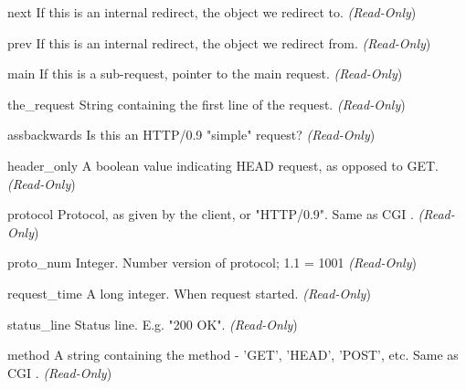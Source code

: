 \begin{memberdesc}[Request]{next}
If this is an internal redirect, the  object we redirect to. 
\emph{(Read-Only})
\end{memberdesc}

\begin{memberdesc}[Request]{prev}
If this is an internal redirect, the  object we redirect from.
\emph{(Read-Only})
\end{memberdesc}

\begin{memberdesc}[Request]{main}
If this is a sub-request, pointer to the main request. 
\emph{(Read-Only})
\end{memberdesc}

\begin{memberdesc}[Request]{the_request}
String containing the first line of the request.
\emph{(Read-Only})
\end{memberdesc}

\begin{memberdesc}[Request]{assbackwards}
Is this an HTTP/0.9 "simple" request? 
\emph{(Read-Only})
\end{memberdesc}

\begin{memberdesc}[Request]{header_only}
A boolean value indicating HEAD request, as opposed to GET. 
\emph{(Read-Only})
\end{memberdesc}

\begin{memberdesc}[Request]{protocol}
Protocol, as given by the client, or "HTTP/0.9". Same as CGI .
\emph{(Read-Only})
\end{memberdesc}

\begin{memberdesc}[Request]{proto_num}
Integer. Number version of protocol; 1.1 = 1001 
\emph{(Read-Only})
\end{memberdesc}

\begin{memberdesc}[Request]{request_time}
A long integer. When request started.
\emph{(Read-Only})
\end{memberdesc}

\begin{memberdesc}[Request]{status_line}
Status line. E.g. "200 OK". 
\emph{(Read-Only})
\end{memberdesc}

\begin{memberdesc}[Request]{method}
A string containing the method - 'GET', 'HEAD', 'POST', etc.
Same as CGI .
\emph{(Read-Only})
\end{memberdesc}

